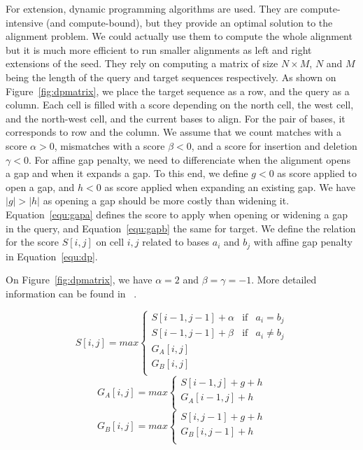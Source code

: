 For extension, dynamic programming algorithms are used. They are compute-intensive (and compute-bound), but they provide an optimal solution to the alignment problem. We could actually use them to compute the whole alignment but it is much more efficient to run smaller alignments as left and right extensions of the seed. They rely on computing a matrix of size $N \times M$, $N$ and $M$ being the length of the query and target sequences respectively. As shown on Figure~\ref{fig:dpmatrix}, we place the target sequence as a row, and the query as a column. Each cell is filled with a score depending on the north cell, the west cell, and the north-west cell, and the current bases to align. For the pair of bases, it corresponds to row and the column. We assume that we count matches with a score $\alpha > 0$, mismatches with a score $\beta < 0$, and a score for insertion and deletion $\gamma < 0$. For affine gap penalty, we need to differenciate when the alignment opens a gap and when it expands a gap. To this end, we define $g < 0$ as score applied to open a gap, and $h < 0$ as score applied when expanding an existing gap. We have $|g| > |h|$ as opening a gap should be more costly than widening it. Equation~\ref{equ:gapa} defines the score to apply when opening or widening a gap in the query, and Equation~\ref{equ:gapb} the same for target. We define the relation for the score $S[i,j]$ on cell $i,j$ related to bases $a_i$ and $b_j$ with affine gap penalty in Equation~\ref{equ:dp}.

On Figure~\ref{fig:dpmatrix}, we have $\alpha = 2$ and $\beta = \gamma = -1$. More detailed information can be found in ~\cite{Aluru:2005:HCM:1121650}.

\begin{equation}
 	S[i,j] = max \left\{
 	\begin{array}{llll}
 		S[i-1, j-1] + \alpha & \mbox{if} & a_i = b_j \\
 		S[i-1, j-1] + \beta & \mbox{if} & a_i \neq b_j \\
 		G_{A}[i,j] \\
 		G_{B}[i,j]\\
 	\end{array}
 	\right.
 	\label{equ:dp}
 \end{equation}
 \begin{equation}
 	G_{A}[i,j] = max \left\{
 	\begin{array}{ll}
 		S[i-1, j] + g + h \\
 		G_{A}[i-1,j] + h \\
 		 
 	\end{array}
 	\right.
 	\label{equ:gapa}
 \end{equation}
  \begin{equation}
 	G_{B}[i,j] = max \left\{
 	\begin{array}{ll}
 		S[i, j-1] + g + h \\
 		G_{B}[i,j-1] + h \\
 		 
 	\end{array}
 	\right.
 	\label{equ:gapb}
 \end{equation}
 
